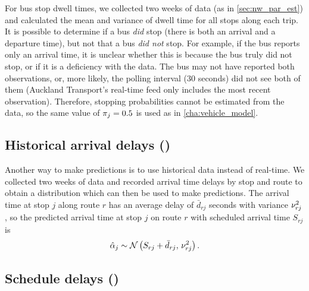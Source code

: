 For bus stop dwell times, we collected two weeks of data (as in \cref{sec:nw_par_est}) and calculated the mean and variance of dwell time for all stops along each trip. It is possible to determine if a bus \emph{did} stop (there is both an arrival and a departure time), but not that a bus \emph{did not} stop. For example, if the bus reports only an arrival time, it is unclear whether this is because the bus truly did not stop, or if it is a deficiency with the data. The bus may not have reported both observations, or, more likely, the polling interval (30 seconds) did not see both of them (Auckland Transport's real-time feed only includes the most recent observation). Therefore, stopping probabilities cannot be estimated from the data, so the same value of $\pi_j=0.5$ is used as in \cref{cha:vehicle_model}.





\subsection[Historical arrival delays]{Historical arrival delays (\Fhist{})}
\label{eq:prediction_arrival_historical}

Another way to make predictions is to use historical data instead of real-time. We collected two weeks of data and recorded arrival time delays by stop and route to obtain a distribution which can then be used to make predictions. The arrival time at stop $j$ along route $r$ has an average delay of $\bar d_{rj}$ seconds with variance $\nu_{rj}^2$, so the predicted arrival time at stop $j$ on route $r$ with scheduled arrival time $S_{rj}$ is
\begin{equation}
\label{eq:arrival_pred_historical}
\hat{\alpha}_{j} \sim \mathcal{N}\left(S_{rj} + \bar d_{rj},\, \nu_{rj}^2\right).
\end{equation}


\subsection[Schedule delays]{Schedule delays (\Fsched{})}
\label{eq:prediction_arrival_sched_delay}



